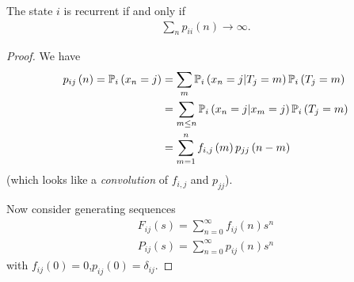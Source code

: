 \documentclass[a4paper]{article}
\begin{document}
\begin{thm}
The state $i$ is recurrent if and only if
\begin{equation*}
\begin{aligned}
\sum_n p_{ii}\left(n\right) \to \infty.
\end{aligned}
\end{equation*}
\begin{proof}
We have
\begin{equation*}
\begin{aligned}
p_{ij}\left(n\right) = \P_i\left(x_n=j\right) &= \sum_m \P_i\left(x_n=j | T_j = m\right) \P_i\left(T_j=m\right)\\
&= \sum_{m \leq n} \P_i \left(x_n = j|x_m=j\right) \P_i\left(T_j=m\right)\\
&=\sum_{m=1}^n f_{i,j}\left(m\right) p_{jj}\left(n-m\right)
\end{aligned}
\end{equation*}
(which looks like a \emph{convolution} of $f_{i,j}$ and $p_{jj}$).

Now consider generating sequences
\begin{equation*}
\begin{aligned}
F_{ij}\left(s\right) = \sum_{n=0}^\infty f_{ij}\left(n\right) s^n\\
P_{ij}\left(s\right) = \sum_{n=0}^\infty p_{ij}\left(n\right) s^n
\end{aligned}
\end{equation*}
with $f_{ij}\left(0\right)=0$,$p_{ij}\left(0\right) = \delta_{ij}$.


\end{proof}
\end{thm}
\end{document}
